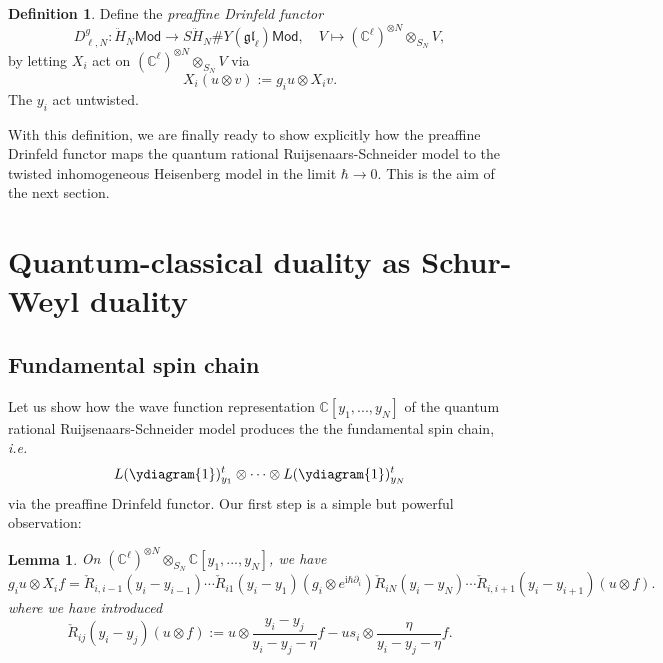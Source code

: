 \documentclass[11pt]{report}
\newtheorem{lemma}[theorem]{Lemma}
\theoremstyle{definition}
\newtheorem{definition}[theorem]{Definition}
\theoremstyle{remark}
\theoremstyle{remark}
\newcommand{\C}{\mathbb{C}}
\newcommand{\I}{\mathrm{i}}
\begin{document}
\begin{definition}
Define the \emph{preaffine Drinfeld functor}
\begin{equation*}
D_{\ell,N}^g: \ddot H_N\mathsf{Mod} \to S\ddot H_N \# Y(\mathfrak{gl}_\ell)\mathsf{Mod}, \quad V \mapsto (\C^\ell)^{\otimes N} \otimes_{S_N} V,
\end{equation*}
by letting $X_i$ act on $(\C^\ell)^{\otimes N} \otimes_{S_N} V$ via
\begin{equation*}
X_i(u \otimes v) := g_i u \otimes X_i v.
\end{equation*}
The $y_i$ act untwisted.
\end{definition}

With this definition, we are finally ready to show explicitly how the preaffine Drinfeld functor maps the quantum rational Ruijsenaars-Schneider model to the twisted inhomogeneous Heisenberg model in the limit $\hbar \to 0$. This is the aim of the next section.

\section{Quantum-classical duality as Schur-Weyl duality}

\subsection{Fundamental spin chain}

Let us show how the wave function representation $\C[y_1,...,y_N]$ of the quantum rational Ruijsenaars-Schneider model produces the the fundamental spin chain, \emph{i.e.}
\begin{equation*}
L(\ydiagram{1})_{y_1}^t \otimes \cdots \otimes L(\ydiagram{1})_{y_N}^t
\end{equation*}
via the preaffine Drinfeld functor. Our first step is a simple but powerful observation:

\begin{lemma}
On $(\C^\ell)^{\otimes N} \otimes_{S_N} \C[y_1,...,y_N]$, we have
\begin{equation*}
g_i u \otimes X_i f = \check R_{i,i-1}(y_i-y_{i-1}) \cdots \check R_{i1}(y_i-y_1) (g_i \otimes e^{\I \hbar \partial_i}) \check R_{iN}(y_i-y_N) \cdots \check R_{i,i+1}(y_i-y_{i+1}) (u \otimes f).
\end{equation*}
where we have introduced
\begin{equation*}
\check R_{ij}(y_i-y_j) (u \otimes f) := u \otimes \frac{y_i-y_j}{y_i-y_j-\eta} f - u s_i \otimes \frac{\eta}{y_i-y_j-\eta} f.
\end{equation*}
\end{lemma}
\end{document}
